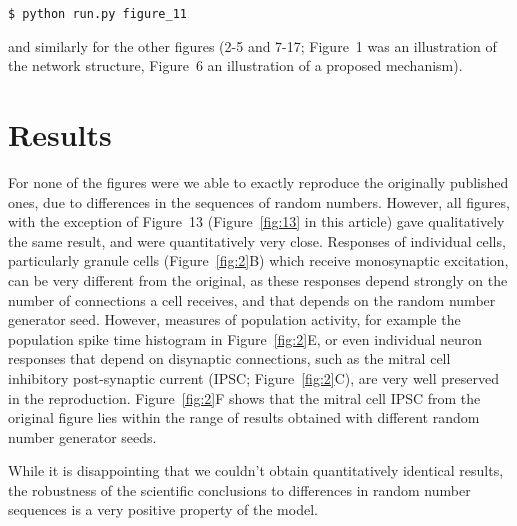 \begin{verbatim}
$ python run.py figure_11
\end{verbatim}

and similarly for the other figures (2-5 and 7-17; Figure~1 was an illustration of the network structure, Figure~6 an illustration of a proposed mechanism).


\section{Results}


For none of the figures were we able to exactly reproduce the originally published ones, due to differences in the sequences of random numbers.
However, all figures, with the exception of Figure~13 (Figure~\ref{fig:13} in this article) gave qualitatively the same result, and were quantitatively very close.
Responses of individual cells, particularly granule cells (Figure~\ref{fig:2}B) which receive monosynaptic excitation, can be very different from the original,
as these responses depend strongly on the number of connections a cell receives, and that depends on the random number generator seed.
However, measures of population activity, for example the population spike time histogram in Figure~\ref{fig:2}E,
or even individual neuron responses that depend on disynaptic connections, such as the mitral cell inhibitory post-synaptic current (IPSC; Figure~\ref{fig:2}C), are very well preserved in the reproduction.
Figure~\ref{fig:2}F shows that the mitral cell IPSC from the original figure lies within the range of results obtained with different random number generator seeds.

While it is disappointing that we couldn't obtain quantitatively identical results,
the robustness of the scientific conclusions to differences in random number sequences is a very positive property of the model.

